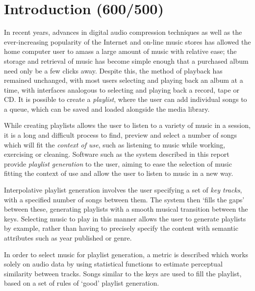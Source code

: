 \chapter{Introduction (600/500)}
\begin{comment}
	\item rationale
	\item purpose
	\item issues
	\item context
	\item relevance
	\item structure of dissertation
\end{comment}
In recent years, advances in digital audio compression techniques as well as the ever-increasing popularity of the Internet and on-line music stores has allowed the home computer user to amass a large amount of music with relative ease; the storage and retrieval of music has become simple enough that a purchased album need only be a few clicks away. Despite this, the method of playback has remained unchanged, with most users selecting and playing back an album at a time, with interfaces analogous to selecting and playing back a record, tape or CD. It is possible to create a \emph{playlist}, where the user can add individual songs to a queue, which can be saved and loaded alongside the media library.

While creating playlists allows the user to listen to a variety of music in a session, it is a long and difficult process to find, preview and select a number of songs which will fit the \emph{context of use}, such as listening to music while working, exercising or cleaning. Software such as the system described in this report provide \emph{playlist generation} to the user, aiming to ease the selection of music fitting the context of use and allow the user to listen to music in a new way.

Interpolative playlist generation involves the user specifying a set of \emph{key tracks}, with a specified number of songs between them. The system then `fills the gaps' between these, generating playlists with a smooth musical transition between the keys. Selecting music to play in this manner allows the user to generate playlists by example, rather than having to precisely specify the content with semantic attributes such as year published or genre.

In order to select music for playlist generation, a metric is described which works solely on audio data by using statistical functions to estimate perceptual similarity between tracks. Songs similar to the keys are used to fill the playlist, based on a set of rules of `good' playlist generation.

